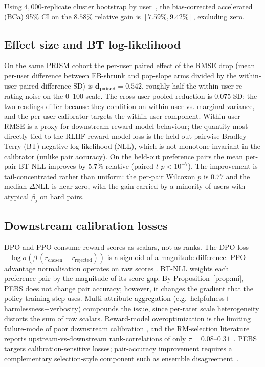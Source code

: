 \documentclass{article}
\newcommand{\PEBS}{\textsc{PEBS}}
\begin{document}
Using $4{,}000$-replicate cluster bootstrap by user~\citep{cameron2008bootstrap,efron1987better},
the bias-corrected accelerated (BCa) 95\% CI on the
$8.58\%$ relative gain is $[7.59\%, 9.42\%]$, excluding zero.

\subsection{Effect size and BT log-likelihood}\label{sec:effectsize}

On the same PRISM cohort the per-user paired effect of the RMSE
drop (mean per-user difference between EB-shrunk and pop-slope arms
divided by the within-user paired-difference SD) is
$\bm{d_{\text{paired}}{=}0.542}$, roughly half the within-user
re-rating noise on the $0$--$100$ scale. The cross-user pooled
reduction is $0.075$ SD; the two readings differ because they
condition on within-user vs. marginal variance, and the per-user
calibrator targets the within-user component. Within-user RMSE is
a proxy for downstream reward-model behaviour; the quantity most
directly tied to the RLHF reward-model loss is the held-out pairwise
Bradley--Terry (BT) negative log-likelihood (NLL), which is not
monotone-invariant in the calibrator (unlike pair accuracy). On the
held-out preference pairs the mean per-pair BT-NLL improves by
$\bm{5.7\%}$ relative (paired-$t$ $p{<}10^{-7}$). The improvement
is tail-concentrated rather than uniform: the per-pair Wilcoxon $p$
is $0.77$ and the median $\Delta\mathrm{NLL}$ is near zero, with
the gain carried by a minority of users with atypical $\beta_j$ on
hard pairs.

\subsection{Downstream calibration losses}\label{sec:why-calib}
DPO and PPO consume reward scores as scalars, not as ranks. The
DPO loss
$-\log\sigma(\beta\,(r_{\text{chosen}}{-}r_{\text{rejected}}))$
\citep{rafailov2023direct} is a sigmoid of a magnitude difference.
PPO advantage normalisation operates on raw scores
\citep{schulman2017proximal,ouyang2022training}. BT-NLL weights
each preference pair by the magnitude of its score gap. By
Proposition~\ref{prop:mi}, PEBS does not change pair accuracy;
however, it changes the gradient that the policy training step uses.
Multi-attribute
aggregation (e.g.\ helpfulness$+$harmlessness$+$verbosity)
compounds the issue, since per-rater scale heterogeneity distorts
the sum of raw scalars. Reward-model overoptimization is the
limiting failure-mode of poor downstream calibration
\citep{gao2023scaling}, and the RM-selection literature reports
upstream-vs-downstream rank-correlations of only
$\tau{=}0.08$--$0.31$~\citep{rmselectioncrisis2025}. \PEBS{}
targets calibration-sensitive losses; pair-accuracy improvement
requires a complementary selection-style component such as
ensemble disagreement~\citep{coste2024reward}.
\end{document}
